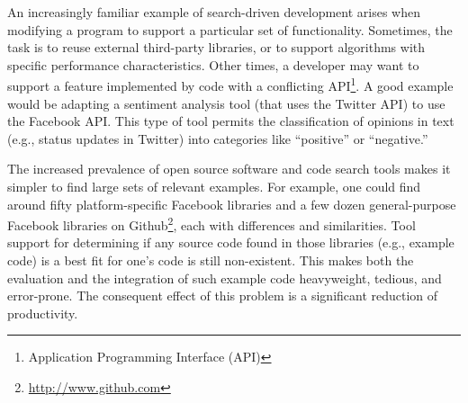 An increasingly familiar example of search-driven development arises when modifying a program to support a particular set of functionality. Sometimes, the task is to reuse external third-party libraries, or to support algorithms with specific performance characteristics. Other times, a developer may want to support a feature implemented by code with a conflicting API\footnote{Application Programming Interface (API)}. A good example would be adapting a sentiment analysis tool (that uses the Twitter API) to use the Facebook API. This type of tool permits the classification of opinions in text (e.g., status updates in Twitter) into categories like ``positive'' or ``negative.'' 

The increased prevalence of open source software and code search tools makes it simpler to find large sets of relevant examples. For example, one could find around fifty platform-specific Facebook libraries and a few dozen general-purpose Facebook libraries on Github\footnote{\url{http://www.github.com}}, each with differences and similarities. Tool support for determining if any source code found in those libraries (e.g., example code) is a best fit for one's code is still non-existent. This makes both the evaluation and the integration of such example code heavyweight, tedious, and error-prone. The consequent effect of this problem is a significant reduction of productivity.

